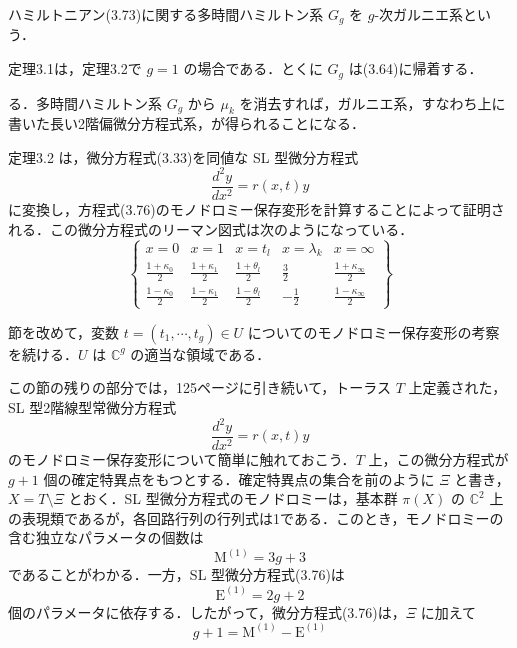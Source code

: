 \begin{definition}[$g$-次ガルニエ系]
ハミルトニアン(3.73)に関する多時間ハミルトン系 $G_g$ を $g$-次ガルニエ系という．
\end{definition}

\begin{story}
定理3.1は，定理3.2で $g=1$ の場合である．とくに $G_g$ は(3.64)に帰着する．
\end{story}

\begin{story}
る．多時間ハミルトン系 $G_g$ から $\mu_k$ を消去すれば，ガルニエ系，すなわち上に書いた長い2階偏微分方程式系，が得られることになる．

定理3.2 は，微分方程式(3.33)を同値な SL 型微分方程式
\begin{equation}
\frac{d^2 y}{dx^2} = r(x,t)y \label{eq:3.76}
\end{equation}
に変換し，方程式(3.76)のモノドロミー保存変形を計算することによって証明される．この微分方程式のリーマン図式は次のようになっている．
\begin{equation*}
\left\{
\begin{array}{ccccc}
x=0 & x=1 & x=t_l & x=\lambda_k & x=\infty \\
\frac{1+\kappa_0}{2} & \frac{1+\kappa_1}{2} & \frac{1+\theta_l}{2} & \frac{3}{2} & \frac{1+\kappa_\infty}{2} \\
\frac{1-\kappa_0}{2} & \frac{1-\kappa_1}{2} & \frac{1-\theta_l}{2} & -\frac{1}{2} & \frac{1-\kappa_\infty}{2}
\end{array}
\right\}
\end{equation*}

節を改めて，変数 $t=(t_1, \cdots, t_g) \in U$ についてのモノドロミー保存変形の考察を続ける．$U$ は $\mathbb{C}^g$ の適当な領域である．

この節の残りの部分では，125ページに引き続いて，トーラス $T$ 上定義された，SL 型2階線型常微分方程式
\begin{equation}
\frac{d^2 y}{dx^2} = r(x,t)y \tag{3.76}
\end{equation}
のモノドロミー保存変形について簡単に触れておこう．$T$ 上，この微分方程式が $g+1$ 個の確定特異点をもつとする．確定特異点の集合を前のように $\Xi$ と書き，$X = T \setminus \Xi$ とおく．SL 型微分方程式のモノドロミーは，基本群 $\pi(X)$ の $\mathbb{C}^2$ 上の表現類であるが，各回路行列の行列式は1である．このとき，モノドロミーの含む独立なパラメータの個数は
\begin{equation*}
\mathrm{M}^{(1)} = 3g+3
\end{equation*}
であることがわかる．一方，SL 型微分方程式(3.76)は
\begin{equation*}
\mathrm{E}^{(1)} = 2g+2
\end{equation*}
個のパラメータに依存する．したがって，微分方程式(3.76)は，$\Xi$ に加えて
\begin{equation*}
g+1 = \mathrm{M}^{(1)} - \mathrm{E}^{(1)}
\end{equation*}
\end{story}

